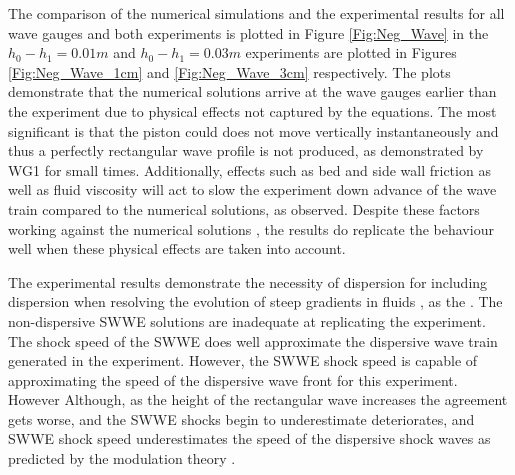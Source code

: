 \documentclass[10pt]{elsarticle}
\providecommand{\DIFaddtex}[1]{{\protect\color{blue} \sf #1}} %
\providecommand{\DIFdeltex}[1]{{\protect\color{red} \scriptsize #1}} %
\providecommand{\DIFaddbegin}{} %
\providecommand{\DIFaddend}{} %
\providecommand{\DIFdelbegin}{} %
\providecommand{\DIFdelend}{} %
\providecommand{\DIFadd}[1]{\texorpdfstring{\DIFaddtex{#1}}{#1}} %
\providecommand{\DIFdel}[1]{\texorpdfstring{\DIFdeltex{#1}}{}} %
\newcommand{\DIFscaledelfig}{0.5}
\newlength{\DIFdelgraphicswidth} %
\newlength{\DIFdelgraphicsheight} %
\newcommand{\DIFaddincludegraphics}[2][]{{\color{blue}\fbox{\DIFOincludegraphics[#1]{#2}}}} %
\newcommand{\DIFdelincludegraphics}[2][]{%
\sbox{\DIFdelgraphicsbox}{\DIFOincludegraphics[#1]{#2}}%
\settoboxwidth{\DIFdelgraphicswidth}{\DIFdelgraphicsbox} %
\settoboxtotalheight{\DIFdelgraphicsheight}{\DIFdelgraphicsbox} %
\scalebox{\DIFscaledelfig}{%
\parbox[b]{\DIFdelgraphicswidth}{\usebox{\DIFdelgraphicsbox}\\[-\baselineskip] \rule{\DIFdelgraphicswidth}{0em}}\llap{\resizebox{\DIFdelgraphicswidth}{\DIFdelgraphicsheight}{%
\setlength{\unitlength}{\DIFdelgraphicswidth}%
\begin{picture}(1,1)%
\thicklines\linethickness{2pt} %
{\color[rgb]{1,0,0}\put(0,0){\framebox(1,1){}}}%
{\color[rgb]{1,0,0}\put(0,0){\line( 1,1){1}}}%
{\color[rgb]{1,0,0}\put(0,1){\line(1,-1){1}}}%
\end{picture}%
}\hspace*{3pt}}} %
} %
\DeclareRobustCommand{\DIFaddbegin}{\DIFOaddbegin \let\includegraphics\DIFaddincludegraphics} %
\DeclareRobustCommand{\DIFaddend}{\DIFOaddend \let\includegraphics\DIFOincludegraphics} %
\DeclareRobustCommand{\DIFdelbegin}{\DIFOdelbegin \let\includegraphics\DIFdelincludegraphics} %
\DeclareRobustCommand{\DIFdelend}{\DIFOaddend \let\includegraphics\DIFOincludegraphics} %
\begin{document}
\DIFaddbegin 

\DIFaddend The comparison of the numerical simulations and the experimental results for all wave gauges \DIFdelbegin \DIFdel{and both experiments is plotted in Figure \ref{Fig:Neg_Wave}}\DIFdelend \DIFaddbegin \DIFadd{in the $h_0 - h_1 = 0.01m$ and $h_0 - h_1 = 0.03m$ experiments are plotted in Figures \ref{Fig:Neg_Wave_1cm} and \ref{Fig:Neg_Wave_3cm} respectively}\DIFaddend . The plots demonstrate that the numerical solutions arrive at the wave gauges earlier than the experiment due to physical effects not captured by the equations. The most significant is that the piston \DIFdelbegin \DIFdel{could }\DIFdelend \DIFaddbegin \DIFadd{does }\DIFaddend not move vertically instantaneously and thus a perfectly rectangular wave profile is not produced, as demonstrated by WG1 for small times.  Additionally, effects such as bed and side wall friction as well as fluid viscosity \DIFdelbegin \DIFdel{will }\DIFdelend act to slow the \DIFdelbegin \DIFdel{experiment down }\DIFdelend \DIFaddbegin \DIFadd{advance of the wave train }\DIFaddend compared to the numerical solutions, as observed. Despite these factors \DIFdelbegin \DIFdel{working against }\DIFdelend the numerical solutions \DIFdelbegin \DIFdel{, the results do }\DIFdelend replicate the behaviour well\DIFdelbegin \DIFdel{when these physical effects are taken into account}\DIFdelend .

The experimental results demonstrate the necessity of \DIFdelbegin \DIFdel{dispersion for }\DIFdelend \DIFaddbegin \DIFadd{including dispersion when }\DIFaddend resolving the evolution of steep gradients in fluids\DIFdelbegin \DIFdel{, as the }\DIFdelend \DIFaddbegin \DIFadd{. The }\DIFaddend non-dispersive SWWE solutions are inadequate at replicating the \DIFdelbegin \DIFdel{experiment. The shock speed of the SWWE does well approximate the }\DIFdelend \DIFaddbegin \DIFadd{dispersive wave train generated in the experiment. However, the SWWE shock speed is capable of approximating the }\DIFaddend speed of the dispersive wave front for this experiment. \DIFdelbegin \DIFdel{However}\DIFdelend \DIFaddbegin \DIFadd{Although}\DIFaddend , as the height of the rectangular wave increases the agreement \DIFdelbegin \DIFdel{gets worse, and the SWWE shocks begin to underestimate }\DIFdelend \DIFaddbegin \DIFadd{deteriorates, and SWWE shock speed underestimates }\DIFaddend the speed of \DIFdelbegin \DIFdel{the }\DIFdelend dispersive shock waves \cite{Pitt-2018-61} as predicted by the modulation theory \cite{El-etal-2006}.
\end{document}
